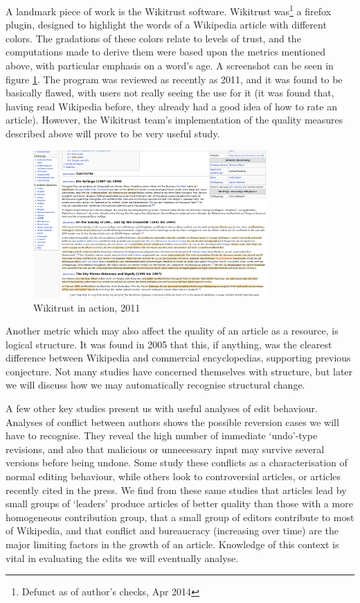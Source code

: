 A landmark piece of work is the Wikitrust software.\cite{Adler2007}
Wikitrust was\footnote{Defunct as of author's checks, Apr 2014} a
firefox plugin, designed to highlight the words of a Wikipedia article
with different colors. The gradations of these colors relate to levels
of trust, and the computations made to derive them were based upon the
metrics mentioned above, with particular emphasis on a word's age. A
screenshot can be seen in figure \ref{fig:wikitrust}. The program was
reviewed as recently as 2011,\cite{Lucassen2011} and it was found to
be basically flawed, with users not really seeing the use for it (it
was found that, having read Wikipedia before, they already had a good
idea of how to rate an article). However, the Wikitrust team's
implementation of the quality measures described above will prove to
be very useful study.

\begin{figure}
  \centering
  \includegraphics[width=0.8\textwidth,clip=true,resolution=300]{img/wikitrust.png}
  \caption{Wikitrust in action, 2011}
  \label{fig:wikitrust}
\end{figure}

Another metric which may also affect the quality of an article as a
resource, is logical structure. It was found in 2005 that this, if
anything, was the clearest difference between Wikipedia and commercial
encyclopedias,\cite{Giles2005} supporting previous
conjecture.\cite{Denning2005} Not many studies have concerned
themselves with structure, but later we will discuss how we may
automatically recognise structural change.

A few other key studies present us with useful analyses of edit
behaviour. Analyses of conflict between authors shows the possible
reversion cases we will have to recognise. They reveal the high number
of immediate `undo'-type revisions, and also that malicious or
unnecessary input may survive several versions before being
undone. Some study these conflicts as a characterisation of normal
editing
behaviour,\cite{Kittur2007}\cite{Kittur2009}\cite{Kittur2010}\cite{Potthast2008}
while others look to controversial articles,\cite{Iba2010} or articles
recently cited in the press.\cite{Lih2004} We find from these same
studies that articles lead by small groups of `leaders' produce
articles of better quality than those with a more homogeneous
contribution group, that a small group of editors contribute to most
of Wikipedia, and that conflict and bureaucracy (increasing over time)
are the major limiting factors in the growth of an
article.\cite{Suh2009} Knowledge of this context is vital in
evaluating the edits we will eventually analyse.
